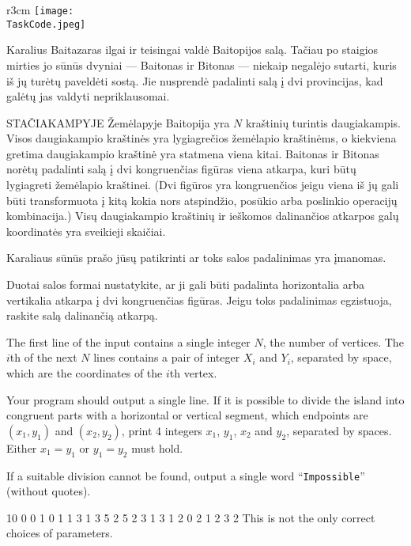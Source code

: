 \documentclass{boi2014-lt}
\renewcommand{\TaskCode}{demarcation}
\newcommand{\constant}[1]{{\tt #1}}
\begin{document}
    \begin{wrapfigure}{r}{3cm}
        \vspace{-24pt}
		\texttt{[image: \\TaskCode.jpeg]}
	\end{wrapfigure}

    Karalius Baitazaras ilgai ir teisingai valdė Baitopijos salą. Tačiau po
    staigios mirties jo sūnūs dvyniai --- Baitonas ir Bitonas --- niekaip
    negalėjo sutarti, kuris iš jų turėtų paveldėti sostą. Jie nusprendė
    padalinti salą į dvi provincijas, kad galėtų jas valdyti nepriklausomai.
 
    STAČIAKAMPYJE Žemėlapyje Baitopija yra $N$ kraštinių turintis daugiakampis.
    Visos daugiakampio kraštinės yra lygiagrečios žemėlapio kraštinėms, o
    kiekviena gretima daugiakampio kraštinė yra statmena viena kitai. Baitonas ir
    Bitonas norėtų padalinti salą į dvi kongruenčias figūras viena atkarpa, kuri
    būtų lygiagreti žemėlapio kraštinei. (Dvi figūros yra kongruenčios jeigu
    viena iš jų gali būti transformuota į kitą kokia nors atspindžio, posūkio
    arba poslinkio operacijų kombinacija.) Visų daugiakampio kraštinių ir
    ieškomos dalinančios atkarpos galų koordinatės yra sveikieji skaičiai.
 
    Karaliaus sūnūs prašo jūsų patikrinti ar toks salos padalinimas yra įmanomas.

    \Task
    Duotai salos formai nustatykite, ar ji gali būti padalinta horizontalia arba
    vertikalia atkarpa į dvi kongruenčias figūras. Jeigu toks padalinimas
    egzistuoja, raskite salą dalinančią atkarpą.

    \Input
	The first line of the input contains a single integer $N$, the number of
	vertices. The $i$th of the next $N$ lines contains a pair of integer $X_i$
	and $Y_i$, separated by space, which are the coordinates of the $i$th
	vertex.

	\Output
	Your program should output a single line. If it is possible to divide the
	island into congruent parts with a horizontal or vertical segment, which
	endpoints are $(x_1, y_1)$ and $(x_2, y_2)$, print 4 integers $x_1$,
	$y_1$, $x_2$ and $y_2$, separated by spaces.
	Either $x_1 = y_1$ or $y_1 = y_2$ must hold.

	If a suitable division cannot be found, output a single word
	``\constant{Impossible}'' (without quotes).

    \Examples
	\example
	{
		10
		0 0
		1 0
		1 1
		3 1
		3 5
		2 5
		2 3
		1 3
		1 2
		0 2
	}
	{
		1 2 3 2
	}
	{
		This is not the only correct choices of parameters.
	}
\end{document}
